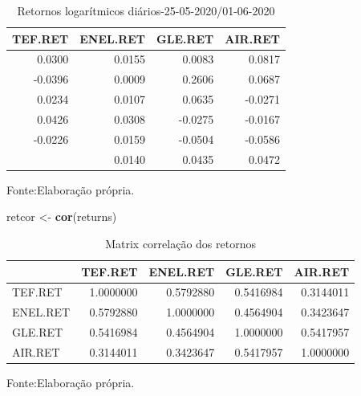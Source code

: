 \documentclass[
  12pt,
  a4paper,
  openany]{book}
\newenvironment{Shaded}{\begin{snugshade}}{\end{snugshade}}
\newcommand{\KeywordTok}[1]{\textcolor[rgb]{0.13,0.29,0.53}{\textbf{#1}}}
\newcommand{\NormalTok}[1]{#1}
\newcommand{\StringTok}[1]{\textcolor[rgb]{0.31,0.60,0.02}{#1}}
\begin{document}
\normalsize

\begin{table}[!h]

\caption{\label{tab:unnamed-chunk-8}Retornos logarítmicos diários-25-05-2020/01-06-2020}
\centering
\begin{tabular}[t]{rrrr}
\toprule
TEF.RET & ENEL.RET & GLE.RET & AIR.RET\\
\midrule
0.0300 & 0.0155 & 0.0083 & 0.0817\\
-0.0396 & 0.0009 & 0.2606 & 0.0687\\
0.0234 & 0.0107 & 0.0635 & -0.0271\\
0.0426 & 0.0308 & -0.0275 & -0.0167\\
-0.0226 & 0.0159 & -0.0504 & -0.0586\\
\addlinespace
0.0368 & 0.0140 & 0.0435 & 0.0472\\
\bottomrule
\end{tabular}
\end{table}
\FloatBarrier
\centering

Fonte:Elaboração própria.

\justifying
\bigskip
\scriptsize

\begin{Shaded}
\begin{Highlighting}[]
\NormalTok{retcor \textless{}{-}}\StringTok{ }\KeywordTok{cor}\NormalTok{(returns)}
\end{Highlighting}
\end{Shaded}

\normalsize

\begin{table}[!h]

\caption{\label{tab:unnamed-chunk-10}Matrix correlação dos retornos}
\centering
\begin{tabular}[t]{lrrrr}
\toprule
  & TEF.RET & ENEL.RET & GLE.RET & AIR.RET\\
\midrule
TEF.RET & 1.0000000 & 0.5792880 & 0.5416984 & 0.3144011\\
ENEL.RET & 0.5792880 & 1.0000000 & 0.4564904 & 0.3423647\\
GLE.RET & 0.5416984 & 0.4564904 & 1.0000000 & 0.5417957\\
AIR.RET & 0.3144011 & 0.3423647 & 0.5417957 & 1.0000000\\
\bottomrule
\end{tabular}
\end{table}
\FloatBarrier
\centering

Fonte:Elaboração própria.
\end{document}
